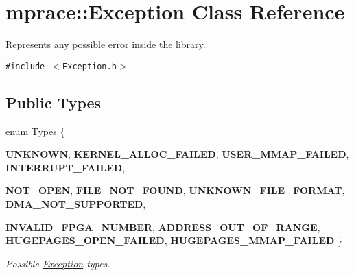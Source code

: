 \hypertarget{classmprace_1_1Exception}{
\section{mprace::Exception Class Reference}
\label{classmprace_1_1Exception}
}
Represents any possible error inside the library.  


{\tt \#include $<$Exception.h$>$}

\subsection*{Public Types}
\begin{CompactItemize}
\item 
enum \hyperlink{classmprace_1_1Exception_w12}{Types} \{ \par
{\bf UNKNOWN}, 
{\bf KERNEL\_\-ALLOC\_\-FAILED}, 
{\bf USER\_\-MMAP\_\-FAILED}, 
{\bf INTERRUPT\_\-FAILED}, 
\par
{\bf NOT\_\-OPEN}, 
{\bf FILE\_\-NOT\_\-FOUND}, 
{\bf UNKNOWN\_\-FILE\_\-FORMAT}, 
{\bf DMA\_\-NOT\_\-SUPPORTED}, 
\par
{\bf INVALID\_\-FPGA\_\-NUMBER}, 
{\bf ADDRESS\_\-OUT\_\-OF\_\-RANGE}, 
{\bf HUGEPAGES\_\-OPEN\_\-FAILED}, 
{\bf HUGEPAGES\_\-MMAP\_\-FAILED}
 \}
\begin{CompactList}\small\item\em Possible \hyperlink{classmprace_1_1Exception}{Exception} types. \item\end{CompactList}\end{CompactItemize}
